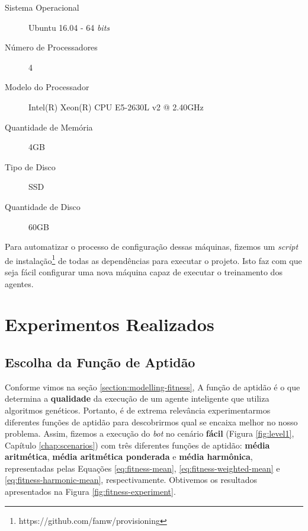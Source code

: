 \begin{description}
    \item [Sistema Operacional] Ubuntu 16.04 - 64 \textit{bits}
    \item [Número de Processadores] 4
    \item [Modelo do Processador] Intel(R) Xeon(R) CPU E5-2630L v2 @ 2.40GHz
    \item [Quantidade de Memória] 4GB
    \item [Tipo de Disco] SSD
    \item [Quantidade de Disco] 60GB
\end{description}

Para automatizar o processo de configuração dessas máquinas, fizemos um
\textit{script} de instalação\footnote{https://github.com/famw/provisioning} de
todas as dependências para executar o projeto. Isto faz com que seja fácil
configurar uma nova máquina capaz de executar o treinamento dos agentes.


\section{\label{section:experiments}Experimentos Realizados}

\subsection{\label{section:fitness-experiment}Escolha da Função de Aptidão}
Conforme vimos na seção \ref{section:modelling-fitness}, A função de aptidão é o
que determina a \textbf{qualidade} da execução de um agente inteligente que
utiliza algoritmos genéticos. Portanto, é de extrema relevância experimentarmos
diferentes funções de aptidão para descobrirmos qual se encaixa melhor no nosso
problema. Assim, fizemos a execução do \textit{bot} no cenário \textbf{fácil}
(Figura \ref{fig:level1}, Capítulo \ref{chap:scenarios}) com três diferentes
funções de aptidão: \textbf{média aritmética}, \textbf{média aritmética
ponderada} e \textbf{média harmônica}, representadas pelas Equações
\ref{eq:fitness-mean}, \ref{eq:fitness-weighted-mean} e
\ref{eq:fitness-harmonic-mean}, respectivamente. Obtivemos os resultados
apresentados na Figura \ref{fig:fitness-experiment}.

